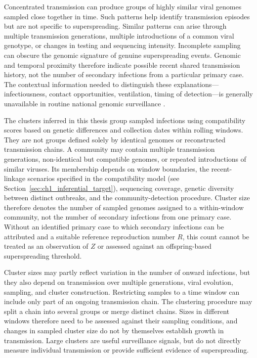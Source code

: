 Concentrated transmission can produce groups of highly similar viral genomes sampled close together in time. Such patterns help identify transmission episodes but are not specific to superspreading. Similar patterns can arise through multiple transmission generations, multiple introductions of a common viral genotype, or changes in testing and sequencing intensity. Incomplete sampling can obscure the genomic signature of genuine superspreading events. Genomic and temporal proximity therefore indicate possible recent shared transmission history, not the number of secondary infections from a particular primary case. The contextual information needed to distinguish these explanations---infectiousness, contact opportunities, ventilation, timing of detection---is generally unavailable in routine national genomic surveillance \citep{Sun2021,Althouse2020,Stein2011}.

The clusters inferred in this thesis group sampled infections using compatibility scores based on genetic differences and collection dates within rolling windows. They are not groups defined solely by identical genomes or reconstructed transmission chains. A community may contain multiple transmission generations, non-identical but compatible genomes, or repeated introductions of similar viruses. Its membership depends on window boundaries, the recent-linkage scenarios specified in the compatibility model (see Section~\ref{sec:ch1_inferential_target}), sequencing coverage, genetic diversity between distinct outbreaks, and the community-detection procedure. Cluster size therefore denotes the number of sampled genomes assigned to a within-window community, not the number of secondary infections from one primary case. Without an identified primary case to which secondary infections can be attributed and a suitable reference reproduction number $R$, this count cannot be treated as an observation of $Z$ or assessed against an offspring-based superspreading threshold.

Cluster sizes may partly reflect variation in the number of onward infections, but they also depend on transmission over multiple generations, viral evolution, sampling, and cluster construction. Restricting samples to a time window can include only part of an ongoing transmission chain. The clustering procedure may split a chain into several groups or merge distinct chains. Sizes in different windows therefore need to be assessed against their sampling conditions, and changes in sampled cluster size do not by themselves establish growth in transmission. Large clusters are useful surveillance signals, but do not directly measure individual transmission or provide sufficient evidence of superspreading.

